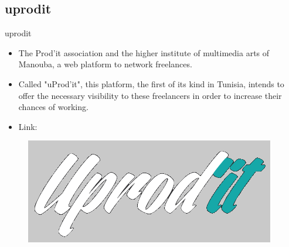 \subsection{uprodit}
\begin{frame}{uprodit}
\hspace{-0.8cm}
\begin{minipage}{0.7\linewidth}
 \renewcommand{\raggedright}{\leftskip=0pt \rightskip=0pt plus 0cm}
\begin{itemize}\itemsep0.5em
    \item The Prod'it association and the higher institute of multimedia arts of Manouba, a web platform to network freelances.
    \item Called "uProd'it", this platform, the first of its kind in Tunisia, intends to offer the necessary visibility to these freelancers in order to increase their chances of working.
    \item Link:  \href{https://www.uprodit.com/}{}
\end{itemize}
\end{minipage}
\hspace{0.4cm}
\begin{minipage}{0.2\linewidth}
\begin{figure}
    \centering
    \includegraphics[scale=0.3]{figures/uprodit.PNG}
\end{figure}
\end{minipage}

\end{frame}

\begin{frame}
\end{frame}

